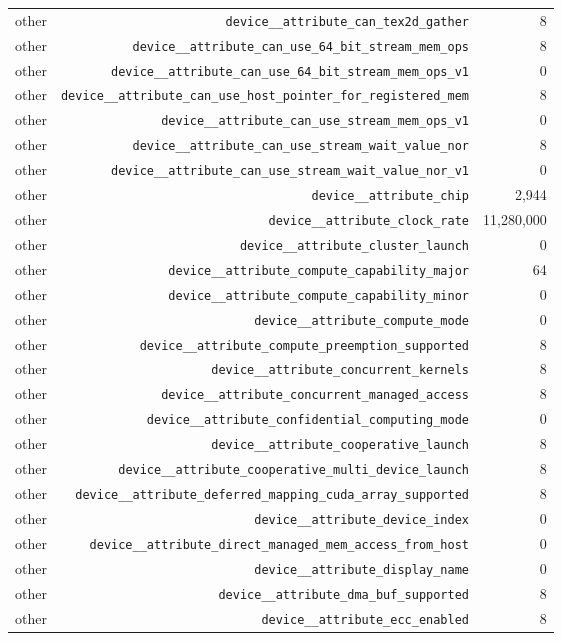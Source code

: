 \begin{table}[h]
\begin{tabular}{|l|r|r|}
other & \texttt{device__attribute_can_tex2d_gather} & 8 \\
other & \texttt{device__attribute_can_use_64_bit_stream_mem_ops} & 8 \\
other & \texttt{device__attribute_can_use_64_bit_stream_mem_ops_v1} & 0 \\
other & \texttt{device__attribute_can_use_host_pointer_for_registered_mem} & 8 \\
other & \texttt{device__attribute_can_use_stream_mem_ops_v1} & 0 \\
other & \texttt{device__attribute_can_use_stream_wait_value_nor} & 8 \\
other & \texttt{device__attribute_can_use_stream_wait_value_nor_v1} & 0 \\
other & \texttt{device__attribute_chip} & 2,944 \\
other & \texttt{device__attribute_clock_rate} & 11,280,000 \\
other & \texttt{device__attribute_cluster_launch} & 0 \\
other & \texttt{device__attribute_compute_capability_major} & 64 \\
other & \texttt{device__attribute_compute_capability_minor} & 0 \\
other & \texttt{device__attribute_compute_mode} & 0 \\
other & \texttt{device__attribute_compute_preemption_supported} & 8 \\
other & \texttt{device__attribute_concurrent_kernels} & 8 \\
other & \texttt{device__attribute_concurrent_managed_access} & 8 \\
other & \texttt{device__attribute_confidential_computing_mode} & 0 \\
other & \texttt{device__attribute_cooperative_launch} & 8 \\
other & \texttt{device__attribute_cooperative_multi_device_launch} & 8 \\
other & \texttt{device__attribute_deferred_mapping_cuda_array_supported} & 8 \\
other & \texttt{device__attribute_device_index} & 0 \\
other & \texttt{device__attribute_direct_managed_mem_access_from_host} & 0 \\
other & \texttt{device__attribute_display_name} & 0 \\
other & \texttt{device__attribute_dma_buf_supported} & 8 \\
other & \texttt{device__attribute_ecc_enabled} & 8 \\

\end{tabular}
\end{table}

